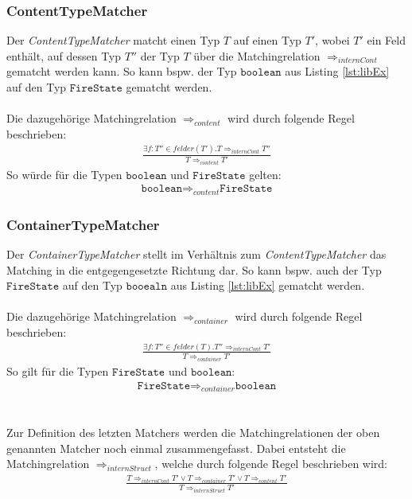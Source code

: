 \documentclass[a4paper,12pt]{article}
\begin{document}
\subsubsection{ContentTypeMatcher}
Der \emph{ContentTypeMatcher} matcht einen Typ $T$ auf einen Typ $T'$, wobei $T'$ ein Feld enthält, auf dessen Typ $T''$ der Typ $T$ über die Matchingrelation $\Rightarrow_{internCont}$ gematcht werden kann. So kann bspw. der Typ $\texttt{boolean}$ aus Listing \ref{lst:libEx} auf den Typ $\texttt{FireState}$ gematcht werden.
\\\\
Die dazugehörige Matchingrelation $\Rightarrow_{content}$ wird durch folgende Regel beschrieben:
\begin{gather*}
\frac{\exists f:T''\in felder(T'). T \Rightarrow_{internCont} T''}{T \Rightarrow_{content} T'}
\end{gather*}
\noindent
So würde für die Typen $\texttt{boolean}$ und $\texttt{FireState}$ gelten: 
\begin{gather*}
\texttt{boolean} \Rightarrow_{content} \texttt{FireState}
\end{gather*}
\subsubsection{ContainerTypeMatcher}
Der \emph{ContainerTypeMatcher} stellt im Verhältnis zum \emph{ContentTypeMatcher} das Matching in die entgegengesetzte Richtung dar. So kann bspw. auch der Typ $\texttt{FireState}$ auf den Typ $\texttt{booealn}$ aus Listing \ref{lst:libEx} gematcht werden.
\\\\
Die dazugehörige Matchingrelation $\Rightarrow_{container}$ wird durch folgende Regel beschrieben:
\begin{gather*}
\frac{\exists f:T''\in felder(T). T'' \Rightarrow_{internCont} T'}{T \Rightarrow_{container} T'}
\end{gather*}
\noindent
So gilt für die Typen $\texttt{FireState}$ und $\texttt{boolean}$: 
\begin{gather*}
\texttt{FireState} \Rightarrow_{container} \texttt{boolean}
\end{gather*}
\\\\
Zur Definition des letzten Matchers werden die Matchingrelationen der oben genannten Matcher noch einmal zusammengefasst. Dabei entsteht die Matchingrelation $\Rightarrow_{internStruct}$, welche durch folgende Regel beschrieben wird:
\begin{gather*}
\frac{T \Rightarrow_{internCont}T' \vee T \Rightarrow_{container} T' \vee T \Rightarrow_{content} T'}{T \Rightarrow_{internStruct}T'}
\end{gather*}
\end{document}
